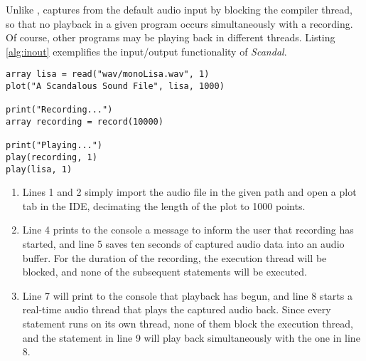 Unlike ,  captures from the default audio input by blocking the compiler thread, so that no playback in a given program occurs simultaneously with a recording. Of course, other programs may be playing back in different threads. Listing \ref{alg:inout} exemplifies the input/output functionality of \emph{Scandal}. %

\begin{lstlisting}[emph={array,read,string,plot,print,record,play,import},emphstyle={\textbf},caption={Inputting and outputting in \emph{Scandal}},label={alg:inout}]
array lisa = read("wav/monoLisa.wav", 1)
plot("A Scandalous Sound File", lisa, 1000)

print("Recording...")
array recording = record(10000)

print("Playing...")
play(recording, 1)
play(lisa, 1)
\end{lstlisting}

\begin{enumerate}
	\item Lines 1 and 2 simply import the audio file in the given path and open a plot tab in the IDE, decimating the length of the plot to 1000 points.
	\addtocounter{enumi}{2}
	\item Line 4 prints to the console a message to inform the user that recording has started, and line 5 saves ten seconds of captured audio data into an audio buffer. For the duration of the recording, the execution thread will be blocked, and none of the subsequent statements will be executed.
	\addtocounter{enumi}{2}
	\item Line 7 will print to the console that playback has begun, and line 8 starts a real-time audio thread that plays the captured audio back. Since every  statement runs on its own thread, none of them block the execution thread, and the statement in line 9 will play back simultaneously with the one in line 8.
\end{enumerate}

